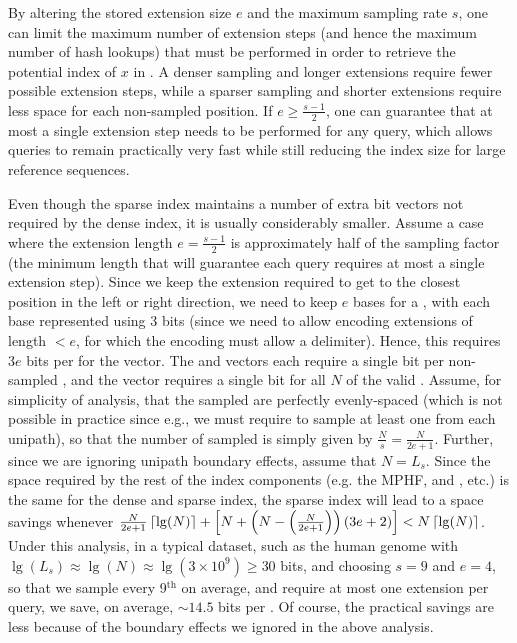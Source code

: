   By altering the stored extension size $e$ and the maximum sampling rate $s$, one
  can limit the maximum number of extension steps (and hence the maximum number of
  hash lookups) that must be performed in order to retrieve the potential index of
  $x$ in \cseq. A denser sampling and longer extensions require fewer possible
  extension steps, while a sparser sampling and shorter extensions require less space
  for each non-sampled position. If $e \geq \frac{s-1}{2}$, one can guarantee that
  at most a single extension step needs to be performed for any \kmer query, which
  allows \kmer queries to remain practically very fast while still reducing the index size for large reference sequences.

  Even though the sparse index maintains a number of extra bit vectors not
  required by the dense index, it is usually considerably smaller. Assume a case
  where the extension length $e = \frac{s-1}{2}$ is approximately half of the
  sampling factor (the minimum length that will guarantee each query requires at
  most a single extension step). Since we keep the extension required to get to
  the closest position in the left or right direction, we need to keep $e$ bases
  for a \kmer, with each base represented using 3 bits (since we need to allow
  encoding extensions of length $<e$, for which the encoding must allow a
  delimiter). Hence, this requires $3e$ bits per \kmer for the \qextvec vector.
  The \canonvec and \extvec vectors each require a single bit per non-sampled \kmer, and
  the \sampvec vector requires a single bit for all $N$ of the valid \kmers.
  Assume, for simplicity of analysis, that the sampled \kmers are perfectly
  evenly-spaced (which is not possible in practice since e.g., we must require to
  sample at least one \kmer from each unipath), so that the number of
  sampled \kmers is simply given by $\frac{N}{s} = \frac{N}{2e+1}$.  Further, since
  we are ignoring unipath boundary effects, assume that $N = L_s$. Since the
  space required by the rest of the index components (e.g. the MPHF, and \ctab, etc.)
  is the same for the dense and sparse index, the sparse index will lead to a space
  savings whenever
  $\frac{N}{2e+1} \left\lceil \lg(N) \right\rceil + \left[ N + \left(N - \left(\frac{N}{2e+1}\right)\right) (3e + 2)\right] < N \left\lceil \lg(N) \right\rceil$.
  Under this analysis, in a typical dataset, such as the human genome with
  $\lg(L_s) \approx \lg(N) \approx \lg(3 \times 10^9) \ge 30$ bits, and choosing $s=9$
  and $e=4$, so that we sample every 9$^\text{th}$ \kmer on average, and require
  at most one extension per query, we save, on average, $\sim14.5$ bits per \kmer.
  Of course, the practical savings are less because of the boundary effects we
  ignored in the above analysis.

